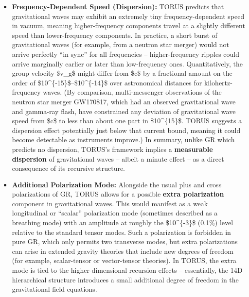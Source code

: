 \documentclass[
]{article}
\begin{document}
{\begin{itemize}
\item
  \textbf{Frequency-Dependent Speed (Dispersion):} TORUS predicts that
  gravitational waves may exhibit an extremely tiny frequency-dependent
  speed in vacuum, meaning higher-frequency components travel at a
  slightly different speed than lower-frequency components\hspace{0pt}.
  In practice, a short burst of gravitational waves (for example, from a
  neutron star merger) would not arrive perfectly ``in sync'' for all
  frequencies -- higher-frequency ripples could arrive marginally
  earlier or later than low-frequency ones. Quantitatively, the group
  velocity \$v\_g\$ might differ from \$c\$ by a fractional amount on
  the order of \$10\^{}\{-15\}\$--\$10\^{}\{-14\}\$ over astronomical
  distances for kilohertz-frequency waves\hspace{0pt}. (By comparison,
  multi-messenger observations of the neutron star merger GW170817,
  which had an observed gravitational wave and gamma-ray flash, have
  constrained any deviation of gravitational wave speed from \$c\$ to
  less than about one part in \$10\^{}\{15\}\$\hspace{0pt}. TORUS
  suggests a dispersion effect potentially just below that current
  bound, meaning it could become detectable as instruments improve.) In
  summary, unlike GR which predicts no dispersion, TORUS's framework
  implies a \textbf{measurable dispersion} of gravitational waves --
  albeit a minute effect -- as a direct consequence of its recursive
  structure.
\item
  \textbf{Additional Polarization Mode:} Alongside the usual plus and
  cross polarizations of GR, TORUS allows for a possible \textbf{extra
  polarization} component in gravitational waves\hspace{0pt}. This would
  manifest as a weak longitudinal or ``scalar'' polarization mode
  (sometimes described as a breathing mode) with an amplitude at roughly
  the \$10\^{}\{-3\}\$ (0.1\%) level relative to the standard tensor
  modes\hspace{0pt}. Such a polarization is forbidden in pure GR, which
  only permits two transverse modes, but extra polarizations can arise
  in extended gravity theories that include new degrees of freedom (for
  example, scalar-tensor or vector-tensor theories). In TORUS, the extra
  mode is tied to the higher-dimensional recursion effects --
  essentially, the 14D hierarchical structure introduces a small
  additional degree of freedom in the gravitational field equations.

\end{itemize}}
\end{document}
